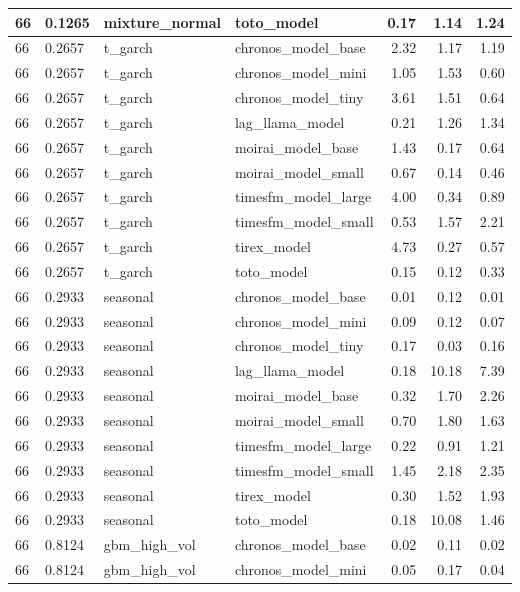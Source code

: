 {\begin{tabular}{llllrrr}
\midrule
66 & 0.1265 & mixture\_normal & toto\_model & 0.17 & 1.14 & 1.24 \\
\midrule
66 & 0.2657 & t\_garch & chronos\_model\_base & 2.32 & 1.17 & 1.19 \\
\midrule
66 & 0.2657 & t\_garch & chronos\_model\_mini & 1.05 & 1.53 & 0.60 \\
\midrule
66 & 0.2657 & t\_garch & chronos\_model\_tiny & 3.61 & 1.51 & 0.64 \\
\midrule
66 & 0.2657 & t\_garch & lag\_llama\_model & 0.21 & 1.26 & 1.34 \\
\midrule
66 & 0.2657 & t\_garch & moirai\_model\_base & 1.43 & 0.17 & 0.64 \\
\midrule
66 & 0.2657 & t\_garch & moirai\_model\_small & 0.67 & 0.14 & 0.46 \\
\midrule
66 & 0.2657 & t\_garch & timesfm\_model\_large & 4.00 & 0.34 & 0.89 \\
\midrule
66 & 0.2657 & t\_garch & timesfm\_model\_small & 0.53 & 1.57 & 2.21 \\
\midrule
66 & 0.2657 & t\_garch & tirex\_model & 4.73 & 0.27 & 0.57 \\
\midrule
66 & 0.2657 & t\_garch & toto\_model & 0.15 & 0.12 & 0.33 \\
\midrule
66 & 0.2933 & seasonal & chronos\_model\_base & 0.01 & 0.12 & 0.01 \\
\midrule
66 & 0.2933 & seasonal & chronos\_model\_mini & 0.09 & 0.12 & 0.07 \\
\midrule
66 & 0.2933 & seasonal & chronos\_model\_tiny & 0.17 & 0.03 & 0.16 \\
\midrule
66 & 0.2933 & seasonal & lag\_llama\_model & 0.18 & 10.18 & 7.39 \\
\midrule
66 & 0.2933 & seasonal & moirai\_model\_base & 0.32 & 1.70 & 2.26 \\
\midrule
66 & 0.2933 & seasonal & moirai\_model\_small & 0.70 & 1.80 & 1.63 \\
\midrule
66 & 0.2933 & seasonal & timesfm\_model\_large & 0.22 & 0.91 & 1.21 \\
\midrule
66 & 0.2933 & seasonal & timesfm\_model\_small & 1.45 & 2.18 & 2.35 \\
\midrule
66 & 0.2933 & seasonal & tirex\_model & 0.30 & 1.52 & 1.93 \\
\midrule
66 & 0.2933 & seasonal & toto\_model & 0.18 & 10.08 & 1.46 \\
\midrule
66 & 0.8124 & gbm\_high\_vol & chronos\_model\_base & 0.02 & 0.11 & 0.02 \\
\midrule
66 & 0.8124 & gbm\_high\_vol & chronos\_model\_mini & 0.05 & 0.17 & 0.04 \\

\end{tabular}}
